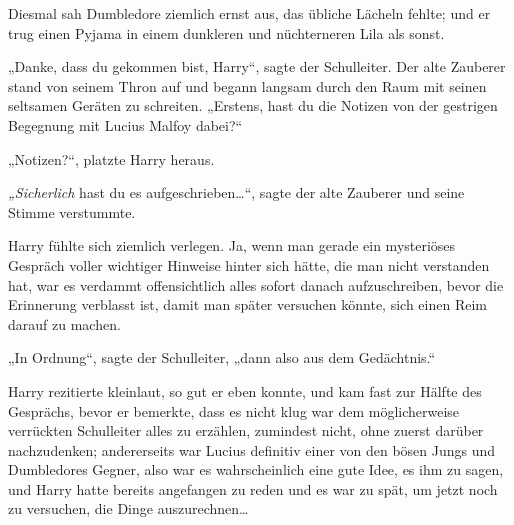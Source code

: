 Diesmal sah Dumbledore ziemlich ernst aus, das übliche Lächeln fehlte; und er trug einen Pyjama in einem dunkleren und nüchterneren Lila als sonst.

„Danke, dass du gekommen bist, Harry“, sagte der Schulleiter. Der alte Zauberer stand von seinem Thron auf und begann langsam durch den Raum mit seinen seltsamen Geräten zu schreiten. „Erstens, hast du die Notizen von der gestrigen Begegnung mit Lucius Malfoy dabei?“

„Notizen?“, platzte Harry heraus.

\emph{„Sicherlich} hast du es aufgeschrieben…“, sagte der alte Zauberer und seine Stimme verstummte.

Harry fühlte sich ziemlich verlegen. Ja, wenn man gerade ein mysteriöses Gespräch voller wichtiger Hinweise hinter sich hätte, die man nicht verstanden hat, war es verdammt offensichtlich alles sofort danach aufzuschreiben, bevor die Erinnerung verblasst ist, damit man später versuchen könnte, sich einen Reim darauf zu machen.

„In Ordnung“, sagte der Schulleiter, „dann also aus dem Gedächtnis.“

Harry rezitierte kleinlaut, so gut er eben konnte, und kam fast zur Hälfte des Gesprächs, bevor er bemerkte, dass es nicht klug war dem möglicherweise verrückten Schulleiter alles zu erzählen, zumindest nicht, ohne zuerst darüber nachzudenken; andererseits war Lucius definitiv einer von den bösen Jungs und Dumbledores Gegner, also war es wahrscheinlich eine gute Idee, es ihm zu sagen, und Harry hatte bereits angefangen zu reden und es war zu spät, um jetzt noch zu versuchen, die Dinge auszurechnen…

